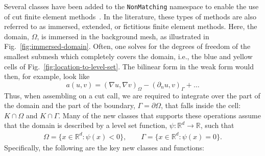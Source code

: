\documentclass{ansarticle-preprint}
\begin{document}
Several classes have been added to the \texttt{NonMatching} namespace to enable the use of cut finite element methods~\cite{burman_cutfem_2015}.
In the literature, these types of methods are also referred to as immersed, extended, or fictitious finite element methods.
Here, the domain, $\Omega$, is immersed in the background mesh, as illustrated in Fig.~\ref{fig:immersed-domain}.
Often, one solves for the degrees of freedom of the smallest submesh
which completely covers the domain, i.e., the blue and yellow cells of
Fig.~\ref{fig:location-to-level-set}.
The bilinear form in the weak form would then, for example, look like
\begin{equation}
  a(u,v) = (\nabla u, \nabla v)_\Omega - (\partial_n u, v)_\Gamma + \ldots
\end{equation}
Thus, when assembling on a cut call, we are
required to integrate over the part of the domain and the part of the boundary, $\Gamma = \partial \Omega$, that falls inside the cell:
$K\cap \Omega$ and $K \cap \Gamma$.
Many of the new classes that supports these operations assume that the domain is described by a level set function,
$\psi : \mathbb{R}^d \to \mathbb{R}$, such that
\begin{align}
  \Omega = \{x \in \mathbb{R}^d : \psi(x)<0\},
  \qquad
  \Gamma = \{x \in \mathbb{R}^d : \psi(x) = 0\}.
\end{align}
Specifically, the following are the key new classes and functions:
\end{document}
